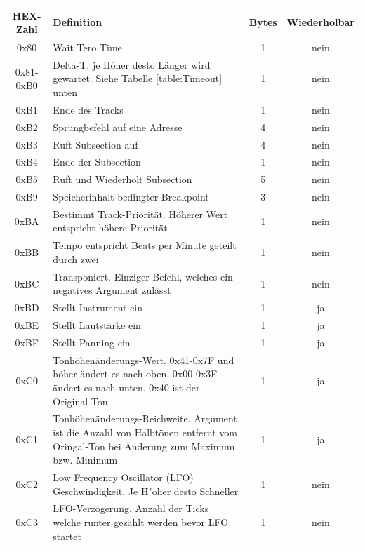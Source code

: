 \documentclass[11pt,a4paper]{scrartcl}
\begin{document}
\newpage
\begin{table}[!h]
    \centering
    \begin{tabular}{ c | p{11cm}| c | c}
        \textbf{HEX-Zahl} & \textbf{Definition} & \textbf{Bytes} & \textbf{Wiederholbar}\\
        \hline
        0x80 & Wait Tero Time & 1 & nein\\
        \hline
        0x81-0xB0 & Delta-T, je H\"{o}her desto L\"{a}nger wird gewartet. Siehe Tabelle \ref{table:Timeout} unten & 1 & nein\\
        \hline
        0xB1 & Ende des Tracks& 1 & nein\\
				\hline
        0xB2 & Sprungbefehl auf eine Adresse& 4 & nein\\
				\hline
        0xB3 & Ruft Subsection auf & 4 & nein\\
				\hline
        0xB4 & Ende der Subsection & 1 & nein\\
				\hline
        0xB5 & Ruft und Wiederholt Subsection & 5 & nein\\
				\hline
				0xB9 & Speicherinhalt bedingter Breakpoint & 3 & nein\\
				\hline
        0xBA & Bestimmt Track-Priorit\"{a}t. H\"{o}herer Wert entspricht h\"{o}here Priorit\"{a}t & 1 & nein\\
				\hline
        0xBB & Tempo entspricht Beats per Minute geteilt durch zwei & 1 & nein\\
				\hline
        0xBC & Transponiert. Einziger Befehl, welches ein negatives Argument zul\"{a}sst & 1 & nein\\
				\hline
        0xBD & Stellt Instrument ein & 1 & ja\\
				\hline
        0xBE & Stellt Lautst\"{a}rke ein & 1 & ja\\
				\hline
        0xBF & Stellt Panning ein & 1 & ja\\
				\hline
        0xC0 & Tonh\"{o}hen\"{a}nderungs-Wert. 0x41-0x7F und h\"{o}her \"{a}ndert es nach oben, 0x00-0x3F \"{a}ndert es nach unten, 0x40 ist der Original-Ton& 1 & ja\\
				\hline
        0xC1 & Tonh\"{o}hen\"{a}nderungs-Reichweite. Argument ist die Anzahl von Halbt\"{o}nen entfernt vom Oringal-Ton bei \"{A}nderung zum Maximum bzw. Minimum& 1 & ja\\
				\hline
        0xC2 & Low Frequency Oscillator (LFO) Geschwindigkeit. Je H"{o}her desto Schneller & 1 & nein\\
				\hline
        0xC3 & LFO-Verz\"{o}gerung. Anzahl der Ticks welche runter gez\"{a}hlt werden bevor LFO startet & 1 & nein\\

\end{tabular}
\end{table}
\end{document}
